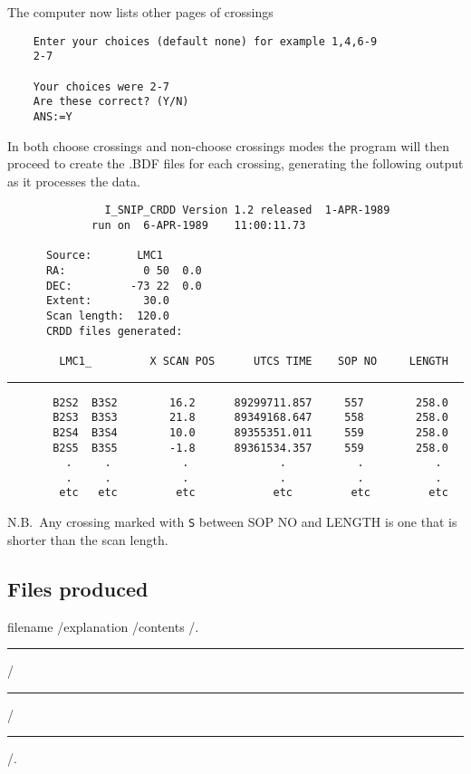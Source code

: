 The computer now lists other pages of crossings 

\begin{verbatim}
    Enter your choices (default none) for example 1,4,6-9
    2-7

    Your choices were 2-7
    Are these correct? (Y/N)
    ANS:=Y
\end{verbatim}
In both choose crossings and non-choose crossings modes the program will then
proceed to create the .BDF files for each crossing, generating the following
output as it processes the data.

\pagebreak
\begin{verbatim}
               I_SNIP_CRDD Version 1.2 released  1-APR-1989
             run on  6-APR-1989    11:00:11.73
                                                      
      Source:       LMC1                                           
      RA:            0 50  0.0      
      DEC:         -73 22  0.0                                        
      Extent:        30.0
      Scan length:  120.0                                             
      CRDD files generated:                                           
                          
        LMC1_         X SCAN POS      UTCS TIME    SOP NO     LENGTH 
\end{verbatim}
\hrule
\begin{verbatim}
       B2S2  B3S2        16.2      89299711.857     557        258.0 
       B2S3  B3S3        21.8      89349168.647     558        258.0 
       B2S4  B3S4        10.0      89355351.011     559        258.0 
       B2S5  B3S5        -1.8      89361534.357     559        258.0 
         .     .           .              .           .           .
         .     .           .              .           .           .
        etc   etc         etc            etc         etc         etc
\end{verbatim}

N.B.\ Any crossing marked with {\tt S} between SOP NO and LENGTH is one that
is shorter than the scan length.

\subsection {Files produced}

\tfile\hfill filename \hfill/\hfill explanation \hfill/\hfill contents \hfill/.

\tfile \hrule/\hrule/\hrule/.

